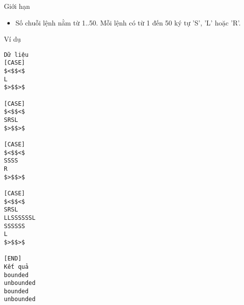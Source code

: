 Giới hạn  
\begin{itemize}
	\item     Số chuỗi lệnh nằm từ 1..50. Mỗi lệnh có từ 1 đến 50 ký tự 'S', 'L' hoặc 'R'.   
\end{itemize}
   Ví dụ  
\begin{verbatim}
Dữ liệu
[CASE]
$<$$<$
L
$>$$>$

[CASE]
$<$$<$
SRSL
$>$$>$

[CASE]
$<$$<$
SSSS
R
$>$$>$

[CASE]
$<$$<$
SRSL
LLSSSSSSL
SSSSSS
L
$>$$>$

[END]
Kết quả
bounded
unbounded
bounded
unbounded
\end{verbatim}